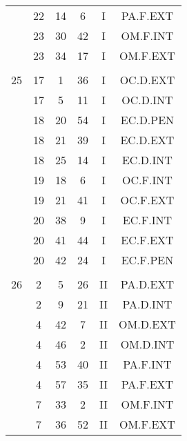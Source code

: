 \documentclass[12pt, a4paper]{article}
\begin{document}
\begin{multicols}{3}
{\begin{tabular}{c c c c c c}
	 	 	 	 & 22 & 14 & 6 & I & PA.F.EXT\\%
	 	 	 	 & 23 & 30 & 42 & I & OM.F.INT\\%
	 	 	 	 & 23 & 34 & 17 & I & OM.F.EXT\\%
	 	 	 	 & & & & & \\%
	 	 	 	25 & 17 & 1 & 36 & I & OC.D.EXT\\%
	 	 	 	 & 17 & 5 & 11 & I & OC.D.INT\\%
	 	 	 	 & 18 & 20 & 54 & I & EC.D.PEN\\%
	 	 	 	 & 18 & 21 & 39 & I & EC.D.EXT\\%
	 	 	 	 & 18 & 25 & 14 & I & EC.D.INT\\%
	 	 	 	 & 19 & 18 & 6 & I & OC.F.INT\\%
	 	 	 	 & 19 & 21 & 41 & I & OC.F.EXT\\%
	 	 	 	 & 20 & 38 & 9 & I & EC.F.INT\\%
	 	 	 	 & 20 & 41 & 44 & I & EC.F.EXT\\%
	 	 	 	 & 20 & 42 & 24 & I & EC.F.PEN\\%
	 	 	 	 & & & & & \\%
	 	 	 	26 & 2 & 5 & 26 & II & PA.D.EXT\\%
	 	 	 	 & 2 & 9 & 21 & II & PA.D.INT\\%
	 	 	 	 & 4 & 42 & 7 & II & OM.D.EXT\\%
	 	 	 	 & 4 & 46 & 2 & II & OM.D.INT\\%
	 	 	 	 & 4 & 53 & 40 & II & PA.F.INT\\%
	 	 	 	 & 4 & 57 & 35 & II & PA.F.EXT\\%
	 	 	 	 & 7 & 33 & 2 & II & OM.F.INT\\%
	 	 	 	 & 7 & 36 & 52 & II & OM.F.EXT\\%

\end{tabular}}
\end{multicols}
\end{document}
